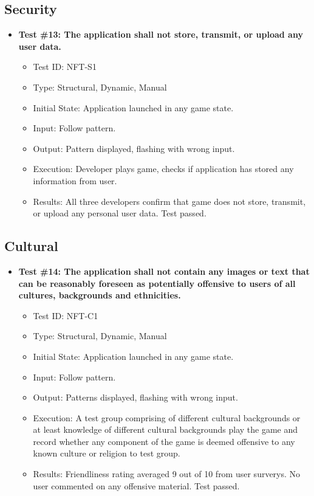 \documentclass[12pt, titlepage]{article}
\begin{document}
\subsection{Security}
\begin{itemize}
\item \textbf{Test \#13: The application shall not store, transmit, or upload any user data.}
\begin{itemize}
\item Test ID: NFT-S1
\item Type: Structural, Dynamic, Manual				
\item Initial State: Application launched in any game state.		
\item Input: Follow pattern.
\item Output: Pattern displayed, flashing with wrong input.		
\item Execution: Developer plays game, checks if application has stored any information from user.
\item Results: All three developers confirm that game does not store, transmit, or upload any personal user data. Test passed.
\end{itemize}
\end{itemize}


\subsection{Cultural}
\begin{itemize}
\item \textbf{Test \#14: The application shall not contain any images or text that can be reasonably foreseen as potentially offensive to users of all cultures, backgrounds and ethnicities.}
\begin{itemize}
\item Test ID: NFT-C1
\item Type: Structural, Dynamic, Manual				
\item Initial State: Application launched in any game state.		
\item Input: Follow pattern.
\item Output: Patterns displayed, flashing with wrong input.		
\item Execution: A test group comprising of different cultural backgrounds or at least knowledge of different cultural backgrounds play the game and record whether any component of the game is deemed offensive to any known culture or religion to test group.
\item Results: Friendliness rating averaged 9 out of 10 from user surverys. No user commented on any offensive material. Test passed.
\end{itemize}
\end{itemize}
\end{document}
